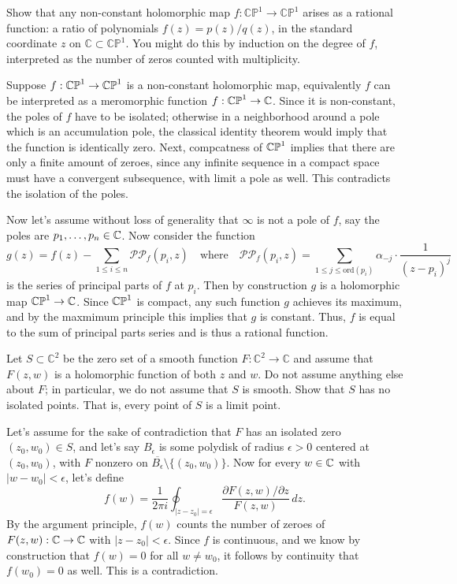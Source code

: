 \documentclass{lkx_pset}
\begin{document}
\begin{problem}{4}
Show that any non-constant holomorphic map $ f : \mathbb{CP}^1 \rightarrow \mathbb{CP}^1 $ arises as a rational function: a ratio of polynomials $ f(z) = p(z)/q(z) $, in the standard coordinate $ z $ on $ \mathbb{C} \subset \mathbb{CP}^1 $. You might do this by induction on the degree of $ f $, interpreted as the number of zeros counted with multiplicity.
\end{problem}

\begin{solution}
  Suppose $f : \mathbb{CP}^1 \to \mathbb{CP}^1$ is a non-constant holomorphic map, equivalently $f$ can be interpreted as a meromorphic function $f: \mathbb{CP}^1 \to \mathbb{C}$. Since it is non-constant, the poles of $f$ have to be isolated; otherwise in a neighborhood around a pole which is an accumulation pole, the classical identity theorem would imply that the function is identically zero. Next, compcatness of $\mathbb{CP}^1$ implies that there are only a finite amount of zeroes, since any infinite sequence in a compact space must have a convergent subsequence, with limit a pole as well. This contradicts the isolation of the poles.

  Now let's assume without loss of generality that $\infty$ is not a pole of $f$, say the poles are $p_1,\ldots, p_n\in \mathbb{C}$. Now consider the function
  \[
    g(z) = f(z) - \sum_{1\leq i\leq n} \mathcal{PP}_{f}(p_i, z) \quad\textrm{where}\quad \mathcal{PP}_{f}(p_i, z)=\sum_{1\leq j\leq \mathrm{ord}(p_i)} \alpha_{-j}\cdot \frac{1}{(z-p_i)^j}
  \]
  is the series of principal parts of $f$ at $p_i$. Then by construction $g$ is a holomorphic map $\mathbb{CP}^1 \to \mathbb{C}$. Since $\mathbb{CP}^1$ is compact, any such function $g$ achieves its maximum, and by the maxmimum principle this implies that $g$ is constant. Thus, $f$ is equal to the sum of principal parts series and is thus a rational function.
\end{solution}

\begin{problem}{5}
Let $ S \subset \mathbb{C}^2 $ be the zero set of a smooth function $ F : \mathbb{C}^2 \rightarrow \mathbb{C} $ and assume that $ F(z, w) $ is a holomorphic function of both $ z $ and $ w $. Do not assume anything else about $ F $; in particular, we do not assume that $ S $ is smooth. Show that $ S $ has no isolated points. That is, every point of $ S $ is a limit point.
\end{problem}

\begin{solution}
  Let's assume for the sake of contradiction that $F$ has an isolated zero $(z_0, w_0)\in S$, and let's say $B_\epsilon$ is some polydisk of radius $\epsilon>0$ centered at $(z_0, w_0)$, with $F$ nonzero on $\overline{B_\epsilon}\setminus \{(z_0, w_0)\}$. Now for every $w\in \mathbb{C}$ with $|w-w_0|<\epsilon$, let's define
  \[
    f(w) = \frac{1}{2\pi i}\oint_{|z-z_0|=\epsilon} \frac{\partial F(z, w)/ \partial z}{F(z, w)}\,dz.
  \]
  By the argument principle, $f(w)$ counts the number of zeroes of $F(z,w) : \mathbb{C} \to \mathbb{C}$ with $|z-z_0|<\epsilon$. Since $f$ is continuous, and we know by construction that $f(w)=0$ for all $w\neq w_0$, it follows by continuity that $f(w_0)=0$ as well. This is a contradiction.
\end{solution}
\end{document}
